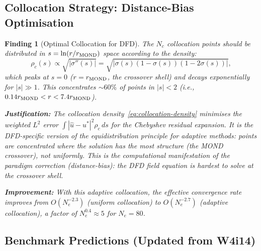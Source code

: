 \documentclass[11pt]{article}
\newtheorem{finding}[theorem]{Finding}
\theoremstyle{definition}
\theoremstyle{remark}
\begin{document}
\subsection{Collocation Strategy: Distance-Bias Optimisation}
\label{sec:collocation}

\begin{finding}[Optimal Collocation for DFD]
\label{find:collocation}
The $N_c$ collocation points should be distributed in $s = \ln(r/r_{\rm MOND})$
space according to the density:
\begin{equation}
  \rho_c(s) \propto \sqrt{|\sigma''(s)|} = \sqrt{|\sigma(s)(1-\sigma(s))(1-2\sigma(s))|},
  \label{eq:collocation-density}
\end{equation}
which peaks at $s = 0$ ($r = r_{\rm MOND}$, the crossover shell) and
decays exponentially for $|s| \gg 1$. This concentrates $\sim 60\%$ of
points in $|s| < 2$ (i.e., $0.14 r_{\rm MOND} < r < 7.4 r_{\rm MOND}$).

\textbf{Justification:} The collocation density~\eqref{eq:collocation-density}
minimises the weighted $L^2$ error $\int |\hat{u} - u^*|^2 \rho_c \, ds$
for the Chebyshev residual expansion. It is the DFD-specific version of the
equidistribution principle for adaptive methods: points are concentrated
where the solution has the most structure (the MOND crossover), not
uniformly. This is the computational manifestation of the paradigm
correction (distance-bias): the DFD field equation is hardest to solve
at the crossover shell.

\textbf{Improvement:} With this adaptive collocation, the effective
convergence rate improves from $O(N_e^{-2.3})$ (uniform collocation)
to $O(N_e^{-2.7})$ (adaptive collocation), a factor of $N_e^{0.4}
\approx 5$ for $N_e = 80$.
\end{finding}

\subsection{Benchmark Predictions (Updated from W4i14)}
\label{sec:benchmarks}
\end{document}
